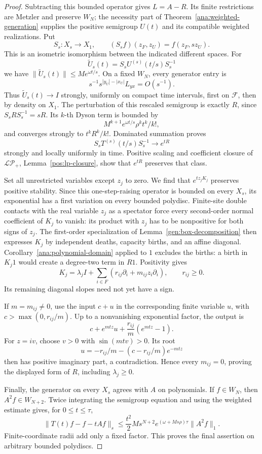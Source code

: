 \documentclass[reqno]{amsart}
\theoremstyle{definition}
\theoremstyle{remark}
\begin{document}
\begin{proof}
Subtracting this bounded operator gives \(L=A-R\).  Its finite restrictions
are Metzler and preserve \(W_N\); the necessity part of
Theorem~\ref{ana:weighted-generation} supplies the positive semigroup
\(U(t)\) and its compatible weighted realizations.  Put
\[
 S_s:X_s\longrightarrow X_1,\qquad
 (S_sf)(z_F,z_U)=f(z_F,sz_U).
\]
This is an isometric isomorphism between the indicated different spaces.
For
\[
 \widetilde U_s(t)=S_sU^{(s)}(t/s)S_s^{-1}
\]
we have \(\|\widetilde U_s(t)\|\le Me^{\omega t/s}\).
On a fixed \(W_N\), every generator entry is
\[
 s^{-1}s^{|y_U|-|x_U|}L_{yx}=O(s^{-1}).
\]
Thus \(\widetilde U_s(t)\to I\) strongly, uniformly on compact time
intervals, first on \(\mathcal F\), then by density on \(X_1\).
The perturbation of this rescaled semigroup is exactly \(R\), since
\(S_sRS_s^{-1}=sR\).  Its \(k\)-th Dyson term is bounded by
\[
 M^{k+1}e^{\omega t/s}\rho^k t^k/k!,
\]
and converges strongly to \(t^kR^k/k!\).  Dominated summation proves
\[
 S_sT^{(s)}(t/s)S_s^{-1}\longrightarrow e^{tR}
\]
strongly and locally uniformly in time.  Positive scaling and coefficient
closure of \(\mathcal{LP}_+\), Lemma~\ref{pos:lp-closure}, show that
\(e^{tR}\) preserves that class.

Set all unrestricted variables except \(z_j\) to zero.  We find that
\(e^{tz_jK_j}\) preserves positive stability.  Since this one-step-raising
operator is bounded on every \(X_s\), its exponential has a first variation
on every bounded polydisc.  Finite-site double contacts
with the real variable \(z_j\) as a spectator force every second-order
normal coefficient of \(K_j\) to vanish: its product with \(z_j\) has to be
nonpositive for both signs of \(z_j\).  The first-order specialization of
Lemma~\ref{gen:box-decomposition} then expresses \(K_j\) by independent deaths, capacity
births, and an affine diagonal.  Corollary~\ref{ana:polynomial-domain}
applied to \(1\) excludes the births: a birth in \(K_j1\) would create a
degree-two term in \(R1\).  Positivity gives
\[
 K_j=\lambda_j I+\sum_{i\in F}(r_{ij}\partial_i+m_{ij}z_i\partial_i),
 \qquad r_{ij}\ge0.
\]
Its remaining diagonal slopes need not yet have a sign.

If \(m=m_{ij}\ne0\), use the input \(c+u\) in the corresponding finite
variable \(u\), with \(c>\max(0,r_{ij}/m)\).  Up to a nonvanishing
exponential factor, the output is
\[
 c+e^{mtz}u+\frac{r_{ij}}m(e^{mtz}-1).
\]
For \(z=iv\), choose \(v>0\) with \(\sin(mtv)>0\).  Its root
\[
 u=-r_{ij}/m-(c-r_{ij}/m)e^{-mtz}
\]
then has positive imaginary part, a contradiction.  Hence every
\(m_{ij}=0\), proving the displayed form of \(R\), including
\(\lambda_j\ge0\).

Finally, the generator on every \(X_s\) agrees with \(A\) on polynomials.
If \(f\in W_N\), then \(A^2f\in W_{N+2}\).  Twice integrating the
semigroup equation and using the weighted estimate gives, for
\(0\le t\le\tau\),
\[
 \|T(t)f-f-tAf\|_s
 \le \frac{t^2}{2}M s^{N+2}
        e^{(\omega+Ms\rho)\tau}\|A^2f\|_1 .
\]
Finite-coordinate radii add only a fixed factor.  This proves the final
assertion on arbitrary bounded polydiscs.
\end{proof}
\end{document}
